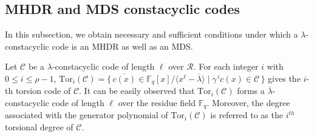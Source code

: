 \documentclass[12pt,a4paper]{article}
\begin{document}
\subsection{MHDR and MDS constacyclic codes}\label{sec:MHDR}
In this subsection, we obtain necessary and sufficient conditions under which a $\lambda$-constacyclic code is an MHDR as well as an MDS.

\medskip
Let $\mathcal{C}$ be a $\lambda$-constacyclic code of length $\ell$ over $\mathcal{R}$. For each integer $i$ with $0 \le i \le \rho-1$, $\mathrm{Tor}_i(\mathcal{C})=\{\,\overline{c(x)}\in \mathbb{F}_q[x]/\langle x^{\ell}- \overline{\lambda} \rangle \mid \gamma^{\,i}c(x) \in \mathcal{C} \,\}$ gives the $i$-th torsion code of $\mathcal{C}$. It can be easily observed that $\mathrm{Tor}_i(\mathcal{C})$ forms a $\overline{\lambda}$-constacyclic code of length $\ell$ over the residue field $\mathbb{F}_q$. Moreover, the degree associated with the generator polynomial of $\mathrm{Tor}_i(\mathcal{C})$ is referred to as the $i^{th}$ torsional degree of $\mathcal{C}$.
\end{document}
